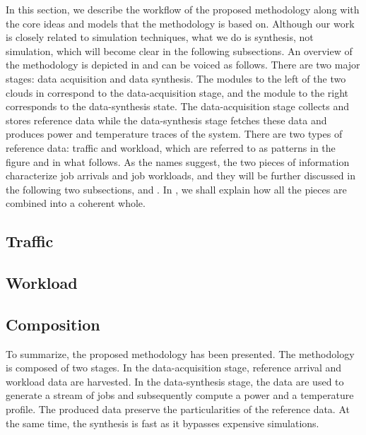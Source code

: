 In this section, we describe the workflow of the proposed methodology along with
the core ideas and models that the methodology is based on. Although our work is
closely related to simulation techniques, what we do is synthesis, not
simulation, which will become clear in the following subsections. An overview of
the methodology is depicted in  and can be voiced as follows.
There are two major stages: data acquisition and data synthesis. The modules to
the left of the two clouds in  correspond to the
data-acquisition stage, and the module to the right corresponds to the
data-synthesis state. The data-acquisition stage collects and stores reference
data while the data-synthesis stage fetches these data and produces power and
temperature traces of the system. There are two types of reference data: traffic
and workload, which are referred to as patterns in the figure and in what
follows. As the names suggest, the two pieces of information characterize job
arrivals and job workloads, and they will be further discussed in the following
two subsections,  and . In , we
shall explain how all the pieces are combined into a coherent whole.

\subsection{Traffic} 


\subsection{Workload} 


\subsection{Composition} 


To summarize, the proposed methodology has been presented. The methodology is
composed of two stages. In the data-acquisition stage, reference arrival and
workload data are harvested. In the data-synthesis stage, the data are used to
generate a stream of jobs and subsequently compute a power and a temperature
profile. The produced data preserve the particularities of the reference data.
At the same time, the synthesis is fast as it bypasses expensive simulations.
